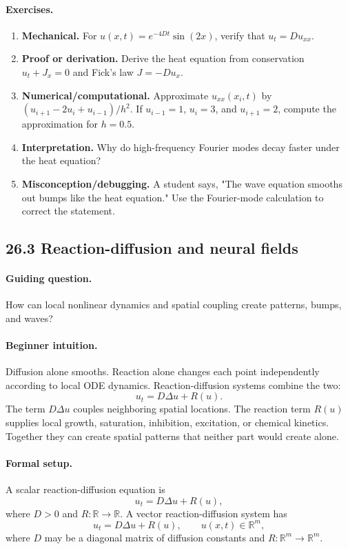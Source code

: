 \paragraph{Exercises.}
\begin{enumerate}[label=\textbf{26.2.\arabic*.}, leftmargin=*]
\item \textbf{Mechanical.} For \(u(x,t)=e^{-4Dt}\sin(2x)\), verify that \(u_t=D u_{xx}\).
\item \textbf{Proof or derivation.} Derive the heat equation from conservation \(u_t+J_x=0\) and Fick's law \(J=-D u_x\).
\item \textbf{Numerical/computational.} Approximate \(u_{xx}(x_i,t)\) by \((u_{i+1}-2u_i+u_{i-1})/h^2\). If \(u_{i-1}=1\), \(u_i=3\), and \(u_{i+1}=2\), compute the approximation for \(h=0.5\).
\item \textbf{Interpretation.} Why do high-frequency Fourier modes decay faster under the heat equation?
\item \textbf{Misconception/debugging.} A student says, "The wave equation smooths out bumps like the heat equation." Use the Fourier-mode calculation to correct the statement.
\end{enumerate}

\subsection{26.3 Reaction-diffusion and neural fields}

\paragraph{Guiding question.}
How can local nonlinear dynamics and spatial coupling create patterns, bumps, and waves?

\paragraph{Beginner intuition.}
Diffusion alone smooths. Reaction alone changes each point independently according to local ODE dynamics. Reaction-diffusion systems combine the two:
\[
u_t=D\Delta u+R(u).
\]
The term \(D\Delta u\) couples neighboring spatial locations. The reaction term \(R(u)\) supplies local growth, saturation, inhibition, excitation, or chemical kinetics. Together they can create spatial patterns that neither part would create alone.

\paragraph{Formal setup.}
A scalar reaction-diffusion equation is
\[
u_t=D\Delta u+R(u),
\]
where \(D>0\) and \(R:\mathbb{R}\to\mathbb{R}\). A vector reaction-diffusion system has
\[
u_t=D\Delta u+R(u),
\qquad
u(x,t)\in\mathbb{R}^m,
\]
where \(D\) may be a diagonal matrix of diffusion constants and \(R:\mathbb{R}^m\to\mathbb{R}^m\).

